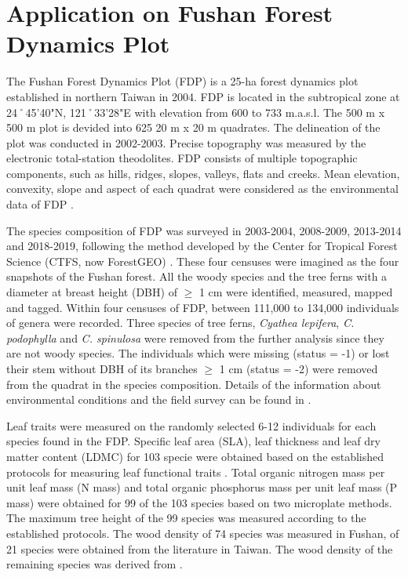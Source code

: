 \section{Application on Fushan Forest Dynamics Plot}
\noindent
The Fushan Forest Dynamics Plot (FDP) is a 25-ha forest dynamics plot established in northern Taiwan in 2004. FDP is located in the subtropical zone at 24˚45'40"N, 121˚33'28"E with elevation from 600 to 733 m.a.s.l. The 500 m x 500 m plot is devided into 625 20 m x 20 m quadrates. The delineation of the plot was conducted in 2002-2003. Precise topography was measured by the electronic total-station theodolites. FDP consists of multiple topographic components, such as hills, ridges, slopes, valleys, flats and creeks. Mean elevation, convexity, slope and aspect of each quadrat were considered as the environmental data of FDP \citep{su2007fushan}. 

The species composition of FDP was surveyed in 2003-2004, 2008-2009, 2013-2014 and 2018-2019, following the method developed by the Center for Tropical Forest Science (CTFS, now ForestGEO) \citep{condit1998tropical}. These four censuses were imagined as the four snapshots of the Fushan forest. All the woody species and the tree ferns with a diameter at breast height (DBH) of $\geq$ 1 cm were identified, measured, mapped and tagged. Within four censuses of FDP, between 111,000 to 134,000 individuals of \DIFdelbegin {}\DIFdelend \DIFaddbegin {}\DIFaddend genera were recorded. Three species of tree ferns, \textit{Cyathea lepifera}, \textit{C. podophylla} and \textit{C. spinulosa} were removed from the further analysis since they are not woody species. The individuals which were missing (status = -1) or lost their stem without DBH of its branches $\geq$ 1 cm (status = -2) were removed from the quadrat in the species composition. Details of the information about environmental conditions and the field survey can be found in \citet{su2007fushan}.

Leaf traits were measured on the randomly selected 6-12 individuals for each species found in the FDP. Specific leaf area (SLA), leaf thickness and leaf dry matter content (LDMC) for 103 specie were obtained based on the established protocols for measuring leaf functional traits \citep{hrguindeguy2013new}. Total organic nitrogen mass per unit leaf mass (N mass) and total organic phosphorus mass per unit leaf mass (P mass) were obtained for 99 of the 103 species based on two microplate methods. The maximum tree height of the 99 species was measured according to the established protocols. The wood density of 74 species was measured in Fushan, of 21 species were obtained from the literature in Taiwan. The wood density of the remaining species was derived from \citet{chave2009towards}.

